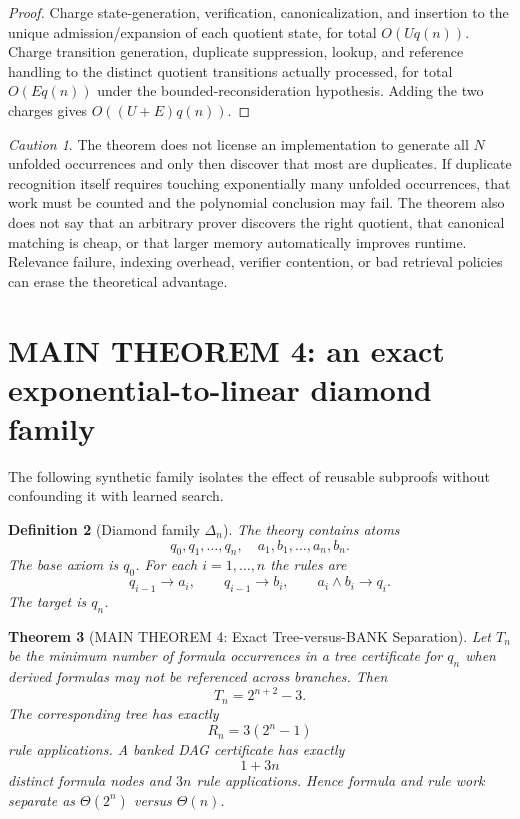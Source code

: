 \documentclass[11pt]{article}
\newtheorem{definition}{Definition}[section]
\newtheorem{theorem}[definition]{Theorem}
\theoremstyle{remark}
\newtheorem{caution}[definition]{Caution}
\begin{document}
\begin{proof}
Charge state-generation, verification, canonicalization, and insertion to the unique admission/expansion of each quotient state, for total $O(Uq(n))$. Charge transition generation, duplicate suppression, lookup, and reference handling to the distinct quotient transitions actually processed, for total $O(Eq(n))$ under the bounded-reconsideration hypothesis. Adding the two charges gives $O((U+E)q(n))$.
\end{proof}

\begin{caution}
The theorem does not license an implementation to generate all $N$ unfolded occurrences and only then discover that most are duplicates. If duplicate recognition itself requires touching exponentially many unfolded occurrences, that work must be counted and the polynomial conclusion may fail. The theorem also does not say that an arbitrary prover discovers the right quotient, that canonical matching is cheap, or that larger memory automatically improves runtime. Relevance failure, indexing overhead, verifier contention, or bad retrieval policies can erase the theoretical advantage.
\end{caution}

\section{MAIN THEOREM 4: an exact exponential-to-linear diamond family}

The following synthetic family isolates the effect of reusable subproofs without confounding it with learned search.

\begin{definition}[Diamond family $\Delta_n$]
The theory contains atoms
\[
q_0,q_1,\ldots,q_n,\quad a_1,b_1,\ldots,a_n,b_n.
\]
The base axiom is $q_0$. For each $i=1,\ldots,n$ the rules are
\[
q_{i-1}\to a_i,\qquad q_{i-1}\to b_i,\qquad a_i\wedge b_i\to q_i.
\]
The target is $q_n$.
\end{definition}

\begin{theorem}[MAIN THEOREM 4: Exact Tree-versus-BANK Separation]
Let $T_n$ be the minimum number of formula occurrences in a tree certificate for $q_n$ when derived formulas may not be referenced across branches. Then
\[
T_n=2^{n+2}-3.
\]
The corresponding tree has exactly
\[
R_n=3(2^n-1)
\]
rule applications. A banked DAG certificate has exactly
\[
1+3n
\]
distinct formula nodes and $3n$ rule applications. Hence formula and rule work separate as $\Theta(2^n)$ versus $\Theta(n)$.
\end{theorem}
\end{document}
